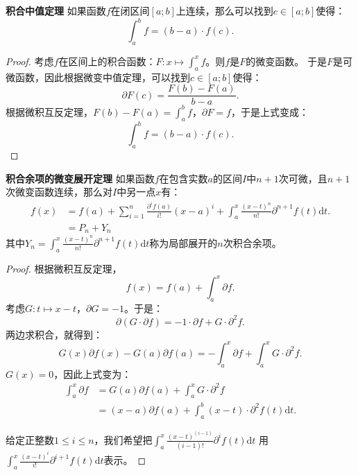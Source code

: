 \documentclass[12pt,UTF8]{ctexbook}
\begin{document}
\begin{appendix}
\begin{tm}{\textbf{积合中值定理}}
    如果函数$f$在闭区间$[a; b]$上连续，那么可以找到$c\in[a;b]$使得：
    $$ \int_a^b f = (b - a)\cdot f(c).$$
\end{tm}

\begin{proof}
    考虑$f$在区间上的积合函数：$F: x\mapsto \int_a^x f$。则$f$是$F$的微变函数。
    于是$F$是可微函数，因此根据微变中值定理，可以找到$c\in[a;b]$使得：
    $$ \partial F(c) = \frac{F(b) - F(a)}{b - a}.$$
    根据微积互反定理，$F(b) - F(a) = \int_a^b f$，$\partial F = f$，于是上式变成：
    $$ \int_a^b f = (b - a)\cdot f(c).$$
\end{proof}


\begin{tm}{\textbf{积合余项的微变展开定理}}
    如果函数$f$在包含实数$a$的区间$I$中$n+1$次可微，且$n+1$次微变函数连续，那么对$I$中另一点$x$有：
    \begin{align*}
        f(x) &= f(a) + \sum_{i=1}^n \frac{\partial^i f(a)}{i!} (x - a)^i + \int_a^x \frac{(x - t)^{n}}{n!} \partial^{n+1} f(t)\mathrm{d}t. \\
        &= P_n + Y_n 
    \end{align*}
    其中$Y_n = \int_a^x \frac{(x - t)^{n}}{n!} \partial^{n+1} f(t)\mathrm{d}t$称为局部展开的$n$次积合余项。
\end{tm}

\begin{proof}
    根据微积互反定理，
    $$ f(x) = f(a) + \int_a^x \partial f .$$
    考虑$G : t \mapsto x - t $，$\partial G = -1$。于是：
    $$ \partial (G\cdot \partial f) = -1 \cdot \partial f + G \cdot \partial^2 f. $$
    两边求积合，就得到：
    $$ G(x) \partial f(x) - G(a) \partial f(a) = - \int_a^x \partial f + \int_a^x G \cdot \partial^2 f. $$
    $G(x) = 0$，因此上式变为：
    \begin{align*}
        \int_a^x \partial f &=  G(a) \partial f(a) + \int_a^x G \cdot \partial^2 f \\
        &= (x - a) \partial f(a) + \int_a^b (x - t) \cdot \partial^2 f(t)\mathrm{d}t. 
    \end{align*}
    
    给定正整数$1\leqslant i \leqslant n$，我们希望把$\int_a^x \frac{(x - t)^{(i-1)}}{(i-1)!} \partial^{i} f(t)\mathrm{d}t$
    用$\int_a^x \frac{(x - t)^{i}}{i!} \partial^{i+1} f(t)\mathrm{d}t$表示。


\end{proof}
\end{appendix}
\end{document}

